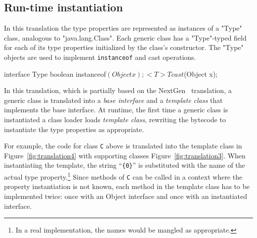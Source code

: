 \documentclass[preprint,nocopyrightspace,9pt]{sigplanconf}
\begin{document}
\begin{figure*}[tp]

\caption{Translation to Java}
\label{fig:translation3}
\end{figure*}

\subsection{Run-time instantiation}

In this translation the type properties are represented as
instances of a \xcd"Type" class, analogous to \xcd"java.lang.Class".
Each generic class has a \xcd"Type"-typed field for each of
its type properties initialized by the class's constructor.
The \xcd"Type" objects
are used to implement {\tt instanceof} and cast operations.
\begin{xten}
interface Type {
    boolean instanceof$(Object x);
    <T> T cast$(Object x);
}
\end{xten}


In this translation, which is partially based on the
NextGen~\cite{allen03,allen04} translation,
a generic class is translated into a \emph{base interface} and
a \emph{template class} that implements the base interface.
At runtime, the first time a generic class is instantiated
a class loader loads \emph{template class}, rewriting the
bytecode to instantiate the type properties as appropriate.

For example, the
code for class {\tt C} above is translated into the template
class in Figure~\ref{fig:translation4}
with supporting classes Figure~\ref{fig:translation3}.
When instantiating the template, the string ``{\tt \{0\}}'' is
substituted with the name of the actual type
property.\footnote{In a real implementation, the names would be
mangled as appropriate.}
Since methods of {\tt C} can be called in a context where the
property instantiation is not known,
each method in the template class has to be implemented twice:
once with an Object interface and once with an instantiated
interface.
\end{document}
